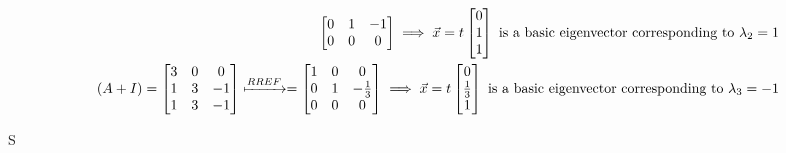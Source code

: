 \begin{align*}
\begin{bmatrix}
    0 & 1 & -1 \\
    0 & 0 & 0
\end{bmatrix} \implies \vec{x} = t \begin{bmatrix}
    0 \\
    1 \\
    1
\end{bmatrix} \text{ is a basic eigenvector corresponding to } \lambda_2 = 1 \\
    (A + I) = \begin{bmatrix}
    3 & 0 & 0 \\
    1 & 3 & -1 \\
    1 & 3 & -1
    \end{bmatrix} \xmapsto{RREF} = \begin{bmatrix}
    1 & 0 & 0 \\
    0 & 1 & -\frac{1}{3} \\
    0 & 0 & 0
\end{bmatrix} \implies \vec{x} = t \begin{bmatrix}
    0 \\
    \frac{1}{3} \\
    1
\end{bmatrix} \text{ is a basic eigenvector corresponding to } \lambda_3 = -1
\end{align*}

S